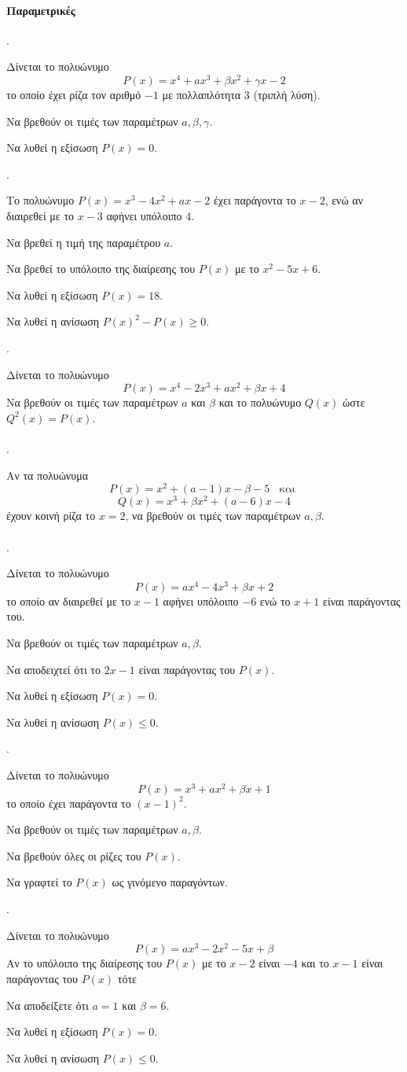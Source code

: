 \documentclass[11pt,a4paper,twocolumn]{article}
\newcounter{askhsh}
\newcommand{\askhsh}{{\large\theaskhsh.}\ \addtocounter{askhsh}{1}}
\begin{document}
\paragraph{Παραμετρικές}
\askhsh Δίνεται το πολυώνυμο \[ P(x)=x^4+ax^3+\beta x^2+\gamma x-2 \] το οποίο έχει ρίζα τον αριθμό $ -1 $ με πολλαπλότητα 3 (τριπλή λύση).
\begin{alist}
\item Να βρεθούν οι τιμές των παραμέτρων $ a,\beta,\gamma $.
\item Να λυθεί η εξίσωση $ P(x)=0 $.
\end{alist}
\askhsh Το πολυώνυμο $ P(x)=x^3-4x^2+ax-2 $ έχει παράγοντα το $ x-2 $, ενώ αν διαιρεθεί με το $ x-3 $ αφήνει υπόλοιπο $ 4 $.
\begin{alist}
\item Να βρεθεί η τιμή της παραμέτρου $ a $.
\item Να βρεθεί το υπόλοιπο της διαίρεσης του $ P(x) $ με το $ x^2-5x+6 $.
\item Να λυθεί η εξίσωση $ P(x)=18 $.
\item Να λυθεί η ανίσωση $ P(x)^2-P(x)\geq 0 $.
\end{alist}
\askhsh Δίνεται το πολυώνυμο \[ P(x)=x^4-2x^3+ax^2+\beta x+4 \] Να βρεθούν οι τιμές των παραμέτρων $ a $ και $ \beta $ και το πολυώνυμο $ Q(x) $ ώστε $ Q^2(x)=P(x) $.\\\\
\askhsh Αν τα πολυώνυμα \[ P(x)=x^2+(a-1)x-\beta-5
\;\;\textrm{ και }\]
\[Q(x) = x^3+\beta x^2+(a-6)x-4 \] έχουν κοινή ρίζα το $ x=2 $, να βρεθούν οι τιμές των παραμέτρων $ a,\beta $.\\\\
\askhsh Δίνεται το πολυώνυμο \[ P(x)=ax^4-4x^3+\beta x+2 \] το οποίο αν διαιρεθεί με το $ x-1 $ αφήνει υπόλοιπο $ -6 $ ενώ το $ x+1 $ είναι παράγοντας του.
\begin{alist}
\item Να βρεθούν οι τιμές των παραμέτρων $ a,\beta $.
\item Να αποδειχτεί ότι το $ 2x-1 $ είναι παράγοντας του $ P(x) $.
\item Να λυθεί η εξίσωση $ P(x)=0 $.
\item Να λυθεί η ανίσωση $ P(x)\leq0 $.
\end{alist}
\askhsh Δίνεται το πολυώνυμο \[ P(x)=x^3+ax^2+\beta x+1 \] το οποίο έχει παράγοντα το $ \left(x-1\right)^2 $.
\begin{alist}
\item Να βρεθούν οι τιμές των παραμέτρων $ a,\beta $.
\item Να βρεθούν όλες οι ρίζες του $ P(x) $.
\item Να γραφτεί το $P(x)$ ως γινόμενο παραγόντων.
\end{alist}
\askhsh Δίνεται το πολυώνυμο \[ P(x)=ax^3-2x^2-5x+\beta \] 
Αν το υπόλοιπο της διαίρεσης του $ P(x) $ με το $ x-2 $ είναι $ -4 $ και το $ x-1 $ είναι παράγοντας του $ P(x) $ τότε
\begin{alist}
\item Να αποδείξετε ότι $ a=1 $ και $ \beta=6 $.
\item Να λυθεί η εξίσωση $ P(x)=0 $.
\item Να λυθεί η ανίσωση $ P(x)\leq0 $.
\end{alist}
\end{document}
